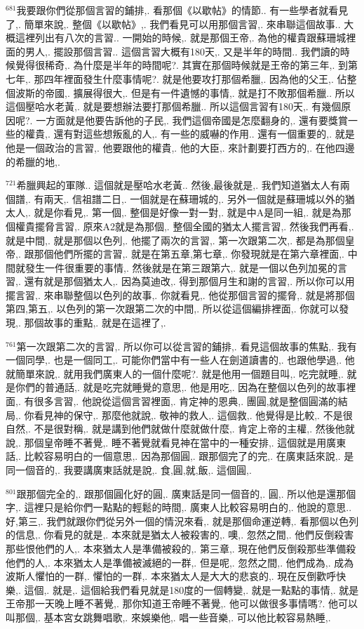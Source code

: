 \documentclass{book}
\begin{document}
$^{681}$我要跟你們從那個言習的鋪排,.
看那個《以歇帖》的情節..
有一些學者就看見了,.
簡單來說,.
整個《以歇帖》,.
我們看見可以用那個言習,.
來串聯這個故事..
大概這裡列出有八次的言習..
一開始的時候,.
就是那個王帝,.
為他的權貴跟蘇珊城裡面的男人,.
擺設那個言習..
這個言習大概有180天,.
又是半年的時間..
我們讀的時候覺得很稀奇,.
為什麼是半年的時間呢?.
其實在那個時候就是王帝的第三年,.
到第七年,.
那四年裡面發生什麼事情呢?.
就是他要攻打那個希臘,.
因為他的父王,.
佔整個波斯的帝國,.
擴展得很大,.
但是有一件遺憾的事情,.
就是打不敗那個希臘..
所以這個壓哈水老黃,.
就是要想辦法要打那個希臘..
所以這個言習有180天,.
有幾個原因呢?.
一方面就是他要告訴他的子民,.
我們這個帝國是怎麼翻身的,.
還有要獎賞一些的權貴,.
還有對這些想叛亂的人,.
有一些的威嚇的作用..
還有一個重要的,.
就是他是一個政治的言習,.
他要跟他的權貴,.
他的大臣,.
來計劃要打西方的,.
在他四邊的希臘的地,.

$^{721}$希臘興起的軍隊..
這個就是壓哈水老黃..
然後,最後就是,.
我們知道猶太人有兩個譜,.
有兩天,.
信祖譜二日,.
一個就是在蘇珊城的,.
另外一個就是蘇珊城以外的猶太人,.
就是你看見,.
第一個,.
整個是好像一對一對,.
就是中A是同一組,.
就是為那個權貴擺脅言習,.
原來A2就是為那個,.
整個全國的猶太人擺言習,.
然後我們再看,.
就是中間,.
就是那個以色列,.
他擺了兩次的言習,.
第一次跟第二次,.
都是為那個皇帝,.
跟那個他們所擺的言習,.
就是在第五章,第七章,.
你發現就是在第六章裡面,.
中間就發生一件很重要的事情,.
然後就是在第三跟第六,.
就是一個以色列加冕的言習,.
還有就是那個猶太人,.
因為莫迪改,.
得到那個月生和謝的言習,.
所以你可以用擺言習,.
來串聯整個以色列的故事,.
你就看見,.
他從那個言習的擺脅,.
就是將那個第四,第五,.
以色列的第一次跟第二次的中間,.
所以從這個編排裡面,.
你就可以發現,.
那個故事的重點,.
就是在這裡了,.

$^{761}$第一次跟第二次的言習,.
所以你可以從言習的鋪排,.
看見這個故事的焦點,.
我有一個同學,.
也是一個同工,.
可能你們當中有一些人在劍道讀書的,.
也跟他學過,.
他就簡單來說,.
就用我們廣東人的一個什麼呢?.
就是他用一個題目叫,.
吃完就睡,.
就是你們的普通話,.
就是吃完就睡覺的意思,.
他是用吃,.
因為在整個以色列的故事裡面,.
有很多言習,.
他說從這個言習裡面,.
肯定神的恩典,.
團圓,就是整個圓滿的結局,.
你看見神的保守,.
那麼他就說,.
敬神的救人,.
這個救,.
他覺得是比較,.
不是很自然,.
不是很對稱,.
就是講到他們就做什麼就做什麼,.
肯定上帝的主權,.
然後他就說,.
那個皇帝睡不著覺,.
睡不著覺就看見神在當中的一種安排,.
這個就是用廣東話,.
比較容易明白的一個意思,.
因為那個圓,.
跟那個完了的完,.
在廣東話來說,.
是同一個音的,.
我要講廣東話就是說,.
食,圓,就,飯,.
這個圓,.

$^{801}$跟那個完全的,.
跟那個圓化好的圓,.
廣東話是同一個音的,.
圓,.
所以他是還那個字,.
這裡只是給你們一點點的輕鬆的時間,.
廣東人比較容易明白的,.
他說的意思..
好,第三,.
我們就跟你們從另外一個的情況來看,.
就是那個命運逆轉,.
看那個以色列的信息,.
你看見的就是,.
本來就是猶太人被殺害的,.
噢,.
忽然之間,.
他們反倒殺害那些恨他們的人,.
本來猶太人是準備被殺的,.
第三章,.
現在他們反倒殺那些準備殺他們的人,.
本來猶太人是準備被滅絕的一群,.
但是呢,.
忽然之間,.
他們成為,.
成為波斯人懼怕的一群,.
懼怕的一群,.
本來猶太人是大大的悲哀的,.
現在反倒歡呼快樂,.
這個,.
就是,.
這個給我們看見就是180度的一個轉變,.
就是一點點的事情,.
就是王帝那一天晚上睡不著覺,.
那你知道王帝睡不著覺,.
他可以做很多事情嗎?.
他可以叫那個,.
基本宮女跳舞唱歌,.
來娛樂他,.
唱一些音樂,.
可以他比較容易熱睡,.
\end{document}
